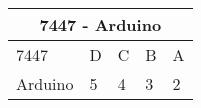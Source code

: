 \documentclass{article}
\begin{document}
\label{table:3}
\begin{tabular}{|p{3cm}|p{1cm}|p{1cm}|p{1cm}|p{1cm}|}                                                                
	\hline
	\multicolumn{5}{|c|}{7447 - Arduino}\\                                                                  \hline                                               
	7447& D& C& B& A\\                                                                                       
	\hline                                               
	Arduino& 5& 4& 3& 2\\                                                                                    
	\hline                                       
\end{tabular}
\end{document}
